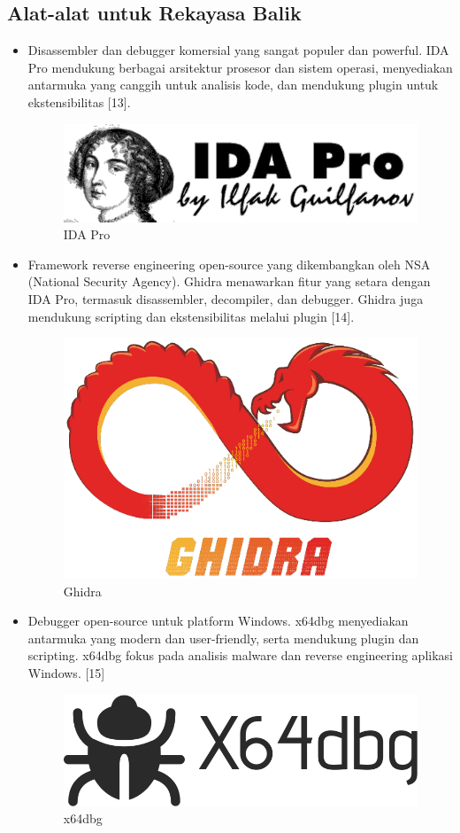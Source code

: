 \subsection{Alat-alat untuk Rekayasa Balik}
\begin{itemize}
	\item {} Disassembler dan debugger komersial yang sangat populer dan powerful. IDA Pro mendukung berbagai arsitektur prosesor dan sistem operasi, menyediakan antarmuka yang canggih untuk analisis kode, dan mendukung plugin untuk ekstensibilitas [13].
	      \begin{figure}
		      \centering
		      \includegraphics[width=.6\textwidth]
		      {assets/pics/IDA_pro.png}
		      \caption{IDA Pro}
	      \end{figure}
	\item {} Framework reverse engineering open-source yang dikembangkan oleh NSA (National Security Agency). Ghidra menawarkan fitur yang setara dengan IDA Pro, termasuk disassembler, decompiler, dan debugger. Ghidra juga mendukung scripting dan ekstensibilitas melalui plugin [14].
	      \begin{figure}
		      \centering
		      \includegraphics[width=.4\textwidth]
		      {assets/pics/Ghidra.png}
		      \caption{Ghidra}
	      \end{figure}
	\item {} Debugger open-source untuk platform Windows. x64dbg menyediakan antarmuka yang modern dan user-friendly, serta mendukung plugin dan scripting. x64dbg fokus pada analisis malware dan reverse engineering aplikasi Windows. [15]
	      \begin{figure}
		      \centering
		      \includegraphics[width=.5\textwidth]
		      {assets/pics/x64Dbg.png}
		      \caption{x64dbg}
	      \end{figure}
\end{itemize}

